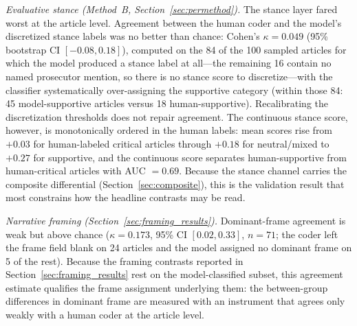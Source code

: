 \documentclass[12pt, letterpaper]{article}
\begin{document}
\emph{Evaluative stance (Method~B, Section~\ref{sec:permethod}).} The stance layer fared worst at the article level. Agreement between the human coder and the model's discretized stance labels was no better than chance: Cohen's $\kappa = 0.049$ (95\% bootstrap CI $[-0.08, 0.18]$), computed on the 84 of the 100 sampled articles for which the model produced a stance label at all---the remaining 16 contain no named prosecutor mention, so there is no stance score to discretize---with the classifier systematically over-assigning the supportive category (within those 84: 45 model-supportive articles versus 18 human-supportive). Recalibrating the discretization thresholds does not repair agreement. The continuous stance score, however, is monotonically ordered in the human labels: mean scores rise from $+0.03$ for human-labeled critical articles through $+0.18$ for neutral/mixed to $+0.27$ for supportive, and the continuous score separates human-supportive from human-critical articles with AUC $= 0.69$. Because the stance channel carries the composite differential (Section~\ref{sec:composite}), this is the validation result that most constrains how the headline contrasts may be read.

\emph{Narrative framing (Section~\ref{sec:framing_results}).} Dominant-frame agreement is weak but above chance ($\kappa = 0.173$, 95\% CI $[0.02, 0.33]$, $n = 71$; the coder left the frame field blank on 24 articles and the model assigned no dominant frame on 5 of the rest). Because the framing contrasts reported in Section~\ref{sec:framing_results} rest on the model-classified subset, this agreement estimate qualifies the frame assignment underlying them: the between-group differences in dominant frame are measured with an instrument that agrees only weakly with a human coder at the article level.
\end{document}
